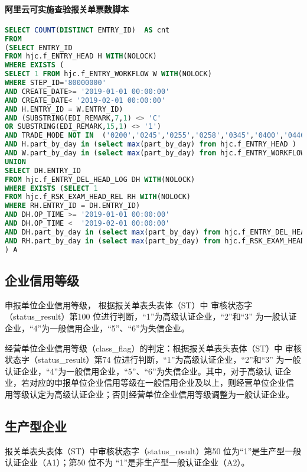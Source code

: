 \documentclass[a4paper]{tufte-book}%
\theoremstyle{definition}
\theoremstyle{definition}
\begin{document}
\paragraph {阿里云可实施查验报关单票数脚本}
\begin{lstlisting}[language={SQL},caption={可实施查验报关单票数},label={can check number entryID} ] 
SELECT COUNT(DISTINCT ENTRY_ID)  AS cnt
FROM 
(SELECT ENTRY_ID
FROM hjc.f_ENTRY_HEAD H WITH(NOLOCK)
WHERE EXISTS (
SELECT 1 FROM hjc.f_ENTRY_WORKFLOW W WITH(NOLOCK)
WHERE STEP_ID='80000000'
AND CREATE_DATE>= '2019-01-01 00:00:00' 
AND CREATE_DATE< '2019-02-01 00:00:00'
AND H.ENTRY_ID = W.ENTRY_ID)
AND (SUBSTRING(EDI_REMARK,7,1) <> 'C' 
OR SUBSTRING(EDI_REMARK,15,1) <> '1')
AND TRADE_MODE NOT IN  ('0200','0245','0255','0258','0345','0400','0446','0456','0500','0642','0644','0654','0657','0744','0844','0845','1139','9639','9700','9800','9839')
AND H.part_by_day in (select max(part_by_day) from hjc.f_ENTRY_HEAD )
AND W.part_by_day in (select max(part_by_day) from hjc.f_ENTRY_WORKFLOW )
UNION
SELECT DH.ENTRY_ID
FROM hjc.f_ENTRY_DEL_HEAD_LOG DH WITH(NOLOCK)
WHERE EXISTS (SELECT 1 
FROM hjc.f_RSK_EXAM_HEAD_REL RH WITH(NOLOCK)
WHERE RH.ENTRY_ID = DH.ENTRY_ID)
AND DH.OP_TIME >= '2019-01-01 00:00:00'
AND DH.OP_TIME <  '2019-02-01 00:00:00'
AND DH.part_by_day in (select max(part_by_day) from hjc.f_ENTRY_DEL_HEAD_LOG )
AND RH.part_by_day in (select max(part_by_day) from hjc.f_RSK_EXAM_HEAD_REL )
) A

\end{lstlisting}

\subsection{企业信用等级}

申报单位企业信用等级，
根据报关单表头表体（ST）中
审核状态字（status\_result）第100 位进行判断，“1”为高级认证企业，“2”和“3”
为一般认证企业，“4”为一般信用企业，“5”、“6”为失信企业。

经营单位企业信用等级（class\_flag）的判定：根据报关单表头表体（ST）中
审核状态字（status\_result）第74 位进行判断，“1”为高级认证企业，“2”和“3”
为一般认证企业，“4”为一般信用企业，“5”、“6”为失信企业。其中，对于高级认
证企业，若对应的申报单位企业信用等级在一般信用企业及以上，则经营单位企业信
用等级认定为高级认证企业；否则经营单位企业信用等级调整为一般认证企业。

\subsection{生产型企业}
报关单表头表体（ST）中审核状态字（status\_result）第50 位为“1”是生产型一般认证企业（A1）；第50 位不为
“1”是非生产型一般认证企业（A2）。
\end{document}
